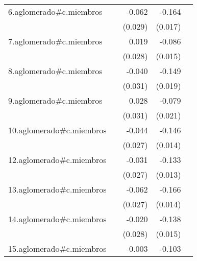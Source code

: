 {\begin{longtable}{l*{4}{D{.}{.}{-1}}}
\addlinespace
6.aglomerado#c.miembros&                     &      -0.062\sym{*}  &      -0.164\sym{***}&                     \\
            &                     &     (0.029)         &     (0.017)         &                     \\
\addlinespace
7.aglomerado#c.miembros&                     &       0.019         &      -0.086\sym{***}&                     \\
            &                     &     (0.028)         &     (0.015)         &                     \\
\addlinespace
8.aglomerado#c.miembros&                     &      -0.040         &      -0.149\sym{***}&                     \\
            &                     &     (0.031)         &     (0.019)         &                     \\
\addlinespace
9.aglomerado#c.miembros&                     &       0.028         &      -0.079\sym{***}&                     \\
            &                     &     (0.031)         &     (0.021)         &                     \\
\addlinespace
10.aglomerado#c.miembros&                     &      -0.044         &      -0.146\sym{***}&                     \\
            &                     &     (0.027)         &     (0.014)         &                     \\
\addlinespace
12.aglomerado#c.miembros&                     &      -0.031         &      -0.133\sym{***}&                     \\
            &                     &     (0.027)         &     (0.013)         &                     \\
\addlinespace
13.aglomerado#c.miembros&                     &      -0.062\sym{*}  &      -0.166\sym{***}&                     \\
            &                     &     (0.027)         &     (0.014)         &                     \\
\addlinespace
14.aglomerado#c.miembros&                     &      -0.020         &      -0.138\sym{***}&                     \\
            &                     &     (0.028)         &     (0.015)         &                     \\
\addlinespace
15.aglomerado#c.miembros&                     &      -0.003         &      -0.103\sym{***}&                     \\

\end{longtable}}
